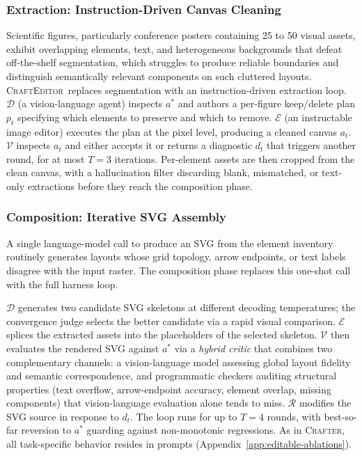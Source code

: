 \documentclass{article}
\newcommand{\Crafter}{\textsc{Crafter}\xspace}
\newcommand{\Editor}{\textsc{CraftEditor}\xspace}
\begin{document}
\subsubsection{Extraction: Instruction-Driven Canvas Cleaning}
\label{sec:method-editor-extraction}

Scientific figures, particularly conference posters containing 25 to 50
visual assets, exhibit overlapping elements, text, and heterogeneous
backgrounds that defeat off-the-shelf segmentation, which struggles to
produce reliable boundaries and distinguish semantically relevant
components on such cluttered layouts. \Editor\ replaces segmentation with
an instruction-driven extraction loop. $\mathcal{D}$ (a vision-language
agent) inspects $a^*$ and authors a per-figure keep/delete plan $p_t$
specifying which elements to preserve and which to remove. $\mathcal{E}$
(an instructable image editor) executes the plan at the pixel level,
producing a cleaned canvas $a_t$. $\mathcal{V}$ inspects $a_t$ and
either accepts it or returns a diagnostic $d_t$ that triggers another
round, for at most $T{=}3$ iterations. Per-element assets are then
cropped from the clean canvas, with a hallucination filter discarding
blank, mismatched, or text-only extractions before they reach the
composition phase.

\subsubsection{Composition: Iterative SVG Assembly}
\label{sec:method-editor-composition}

A single language-model call to produce an SVG from the element inventory routinely generates layouts whose grid topology, arrow endpoints, or text labels disagree with the input raster. The composition phase replaces this one-shot call with the full harness loop.

$\mathcal{D}$ generates two candidate SVG skeletons at different decoding temperatures; the convergence judge selects the better candidate via a rapid visual comparison. $\mathcal{E}$ splices the extracted assets into the placeholders of the selected skeleton. $\mathcal{V}$ then evaluates the rendered SVG against $a^*$ via a \emph{hybrid critic} that combines two complementary channels: a vision-language model assessing global layout fidelity and semantic correspondence, and programmatic checkers auditing structural properties (text overflow, arrow-endpoint accuracy, element overlap, missing components) that vision-language evaluation alone tends to miss. $\mathcal{R}$ modifies the SVG source in response to $d_t$. The loop runs for up to $T{=}4$ rounds, with best-so-far reversion to $a^*$ guarding against non-monotonic regressions. As in \Crafter, all task-specific behavior resides in prompts (Appendix~\ref{app:editable-ablations}).
\end{document}
